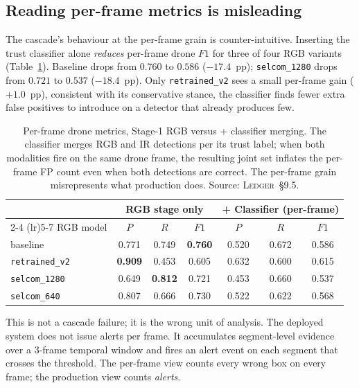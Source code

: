 \documentclass[12pt,a4paper,oneside,openright]{book}
\begin{document}
\subsection{Reading per-frame metrics is misleading}

The cascade's behaviour at the per-frame grain is counter-intuitive. Inserting the trust classifier alone \emph{reduces} per-frame drone $F1$ for three of four RGB variants (Table~\ref{tab:cascade_perframe}). Baseline drops from $0.760$ to $0.586$ ($-17.4$~pp); \texttt{selcom\_1280} drops from $0.721$ to $0.537$ ($-18.4$~pp). Only \texttt{retrained\_v2} sees a small per-frame gain ($+1.0$~pp), consistent with its conservative stance, the classifier finds fewer extra false positives to introduce on a detector that already produces few.

\begin{table}[htbp]
    \centering
    \caption{Per-frame drone metrics, Stage-1 RGB versus + classifier merging. The classifier merges RGB and IR detections per its trust label; when both modalities fire on the same drone frame, the resulting joint set inflates the per-frame FP count even when both detections are correct. The per-frame grain misrepresents what production does. Source: \textsc{Ledger}~\S9.5.}
    \label{tab:cascade_perframe}
    \begin{tabular}{lcccccc}
        \toprule
        & \multicolumn{3}{c}{RGB stage only} & \multicolumn{3}{c}{+ Classifier (per-frame)} \\
        \cmidrule(lr){2-4} \cmidrule(lr){5-7}
        RGB model & $P$ & $R$ & $F1$ & $P$ & $R$ & $F1$ \\
        \midrule
        baseline           & 0.771 & 0.749 & \textbf{0.760} & 0.520 & 0.672 & 0.586 \\
        \texttt{retrained\_v2} & \textbf{0.909} & 0.453 & 0.605 & 0.632 & 0.600 & 0.615 \\
        \texttt{selcom\_1280}  & 0.649 & \textbf{0.812} & 0.721 & 0.453 & 0.660 & 0.537 \\
        \texttt{selcom\_640}   & 0.807 & 0.666 & 0.730 & 0.522 & 0.622 & 0.568 \\
        \bottomrule
    \end{tabular}
\end{table}

This is not a cascade failure; it is the wrong unit of analysis. The deployed system does not issue alerts per frame. It accumulates segment-level evidence over a 3-frame temporal window and fires an alert event on each segment that crosses the threshold. The per-frame view counts every wrong box on every frame; the production view counts \emph{alerts}.
\end{document}
